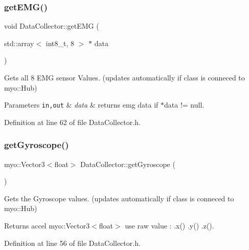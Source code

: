 \subsubsection{\texorpdfstring{get\+E\+M\+G()}{getEMG()}}
{\footnotesize\ttfamily void Data\+Collector\+::get\+E\+MG (\begin{DoxyParamCaption}\item[{std\+::array$<$ int8\+\_\+t, 8 $>$ $\ast$}]{data }\end{DoxyParamCaption})\hspace{0.3cm}{\ttfamily [inline]}}



Gets all 8 E\+MG sensor Values. (updates automatically if class is conneced to myo\+::\+Hub) 


\begin{DoxyParams}[1]{Parameters}
\mbox{\tt in,out}  & {\em data} & returns emg data if $\ast$data != null. \\
\hline
\end{DoxyParams}


Definition at line 62 of file Data\+Collector.\+h.

\mbox{\label{class_data_collector_a04ad19d96b8574ff7c9f945cd1c5ddc6}} 
\subsubsection{\texorpdfstring{get\+Gyroscope()}{getGyroscope()}}
{\footnotesize\ttfamily myo\+::\+Vector3$<$float$>$ Data\+Collector\+::get\+Gyroscope (\begin{DoxyParamCaption}{ }\end{DoxyParamCaption})\hspace{0.3cm}{\ttfamily [inline]}}



Gets the Gyroscope values. (updates automatically if class is conneced to myo\+::\+Hub) 

\begin{DoxyReturn}{Returns}
accel myo\+::\+Vector3$<$float$>$ use raw value \+: .x() .y() .z(). 
\end{DoxyReturn}


Definition at line 56 of file Data\+Collector.\+h.

\mbox{\label{class_data_collector_a46a7e8adb8679fde1021fe89ed0d0be0}} 
